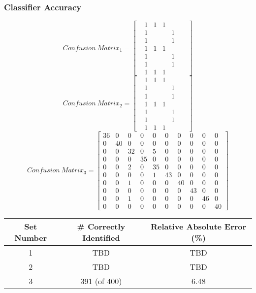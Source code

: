 \documentclass{article}
\begin{document}
			\subsubsection{Classifier Accuracy}
				\[
				Confusion~Matrix_{1} = 
				\begin{bmatrix}
				&1&1&1&&&\\
				&1&&&1&&\\
				&1&&&1&&\\
				&1&1&1&&&\\
				&1&&&1&&\\
				&1&&&1&&\\
				&1&1&1&&&
				\end{bmatrix}
				\]
				\[
				Confusion~Matrix_{2} = 
				\begin{bmatrix}
				&1&1&1&&&\\
				&1&&&1&&\\
				&1&&&1&&\\
				&1&1&1&&&\\
				&1&&&1&&\\
				&1&&&1&&\\
				&1&1&1&&&
				\end{bmatrix}
				\]
				\[
				Confusion~Matrix_{3} = 
				\begin{bmatrix}
				36& 0& 0& 0& 0 &0 & 0 & 0 & 0 & 0\\
				0& 40&  0 & 0 & 0 & 0 & 0 & 0 & 0 & 0\\
				0&  0& 32&  0&  5&  0 & 0 & 0 & 0 & 0\\
				0 & 0 & 0 &35  &0 & 0&  0&  0&  0&  0\\
				0 & 0 & 2 & 0 &35&  0 & 0 & 0 & 0 & 0\\
				0 & 0 & 0 & 0 & 1 &43&  0&  0&  0&  0\\
				0 & 0 & 1 & 0 & 0 & 0 &40&  0&  0&  0\\
				0 & 0&  0&  0&  0 & 0 & 0 &43 & 0 & 0\\
				0 & 0 & 1 & 0 & 0 & 0&  0&  0& 46 & 0\\
				0 & 0&  0&  0&  0&  0&  0&  0&  0& 40
				\end{bmatrix}
				\]
				\linebreak
				
				\begin{minipage}{\linewidth}
					\centering
					\begin{tabular}{c|cc}\label{ResVary}
						Set Number 	& \# Correctly Identified	& Relative Absolute Error (\%) \\
						\hline
						1			&  TBD 			 			&	TBD						 \\
						2			&  TBD				 		&	TBD						 \\ 
						3			&  391 (of 400)		 		&	6.48					 \\
					\end{tabular}
				\end{minipage}
				
\end{document}
